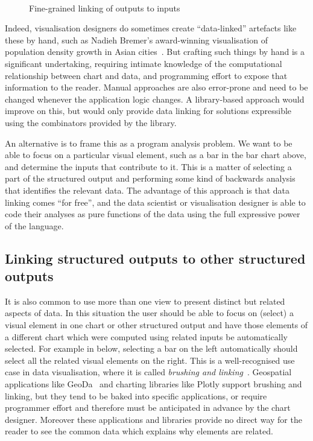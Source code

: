 \begin{figure}[H]
\begin{subfigure}{0.45\textwidth}
   \end{subfigure}\\
   \begin{subfigure}{0.65\textwidth}
      \small
      
   \end{subfigure}
   \caption{Fine-grained linking of outputs to inputs}
   \label{fig:introduction:data-linking}
\end{figure}

Indeed, visualisation designers do sometimes create ``data-linked'' artefacts like these by hand, such as Nadieh Bremer's award-winning visualisation of population density growth in Asian cities~\cite{bremer15}. But crafting such things by hand is a significant undertaking, requiring intimate knowledge of the computational relationship between chart and data, and programming effort to expose that information to the reader. Manual approaches are also error-prone and need to be changed whenever the application logic changes. A library-based approach would improve on this, but would only provide data linking for solutions expressible using the combinators provided by the library.

An alternative is to frame this as a program analysis problem. We want to be able to focus on a particular visual element, such as a bar in the bar chart above, and determine the inputs that contribute to it. This is a matter of selecting a part of the structured output and performing some kind of backwards analysis that identifies the relevant data. The advantage of this approach is that data linking comes ``for free'', and the data scientist or visualisation designer is able to code their analyses as pure functions of the data using the full expressive power of the language.

\subsection{Linking structured outputs to other structured outputs}

 It is also common to use more than one view to present distinct but related aspects of data. In this situation the user should be able to focus on (select) a visual element in one chart or other structured output and have those elements of a different chart which were computed using related inputs be automatically selected. For example in  below, selecting a bar on the left automatically should select all the related visual elements on the right. This is a well-recognised use case in data visualisation, where it is called \emph{brushing and linking}~\cite{becker87}. Geospatial applications like GeoDa~\cite{anselin06} and charting libraries like Plotly support brushing and linking, but they tend to be baked into specific applications, or require programmer effort and therefore must be anticipated in advance by the chart designer. Moreover these applications and libraries provide no direct way for the reader to see the common data which explains why elements are related.

